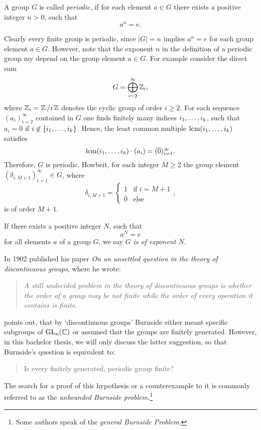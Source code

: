 \begin{defin}
A group $G$ is called \emph{periodic,} if for each element $a\in G$ there exists a positive integer $n>0$, such that
\begin{equation*}
a^n=e.
\end{equation*}
\end{defin}
Clearly every finite group is periodic, since $\lvert G\rvert=n$ implies $a^n=e$ for each group element $a\in G$. However, note that the exponent $n$ in the definition of a periodic group my depend on the group element $a\in G$. For example consider the direct sum
\begin{equation*}
G=\bigoplus_{i=2}^\infty \Z_i,
\end{equation*}
where $\Z_i=\nicefrac{\Z}{i\Z}$ denotes the cyclic group of order $i\geq 2$. For each sequence $(a_i)_{i=2}^\infty$ contained in $G$ one finds finitely many indices $\seq[k]{i}$, such that $a_i=0$ if $i\not\in\lbrace\seq[k]{i}\rbrace$. Hence, the least common multiple $\lcm(\seq[k]{i})$ satisfies
\begin{equation*}
\lcm(\seq[k]{i})\cdot(a_i)=(\overline{0})_{i=1}^\infty.
\end{equation*}
Therefore, $G$ is periodic. Howbeit, for each integer $M\geq 2$ the group element $(\delta_{i,M+1})_{i=1}^\infty\in G$, where
\begin{equation*}
\delta_{i,M+1}=\begin{cases} \overline{1} &\text{if }i=M+1\\ \overline{0}&\text{else}\end{cases},
\end{equation*}
is of order $M+1$.

If there exists a positive integer $N$, such that
\begin{equation*}
a^N=e
\end{equation*}
for all elements $a$ of a group $G$, we say $G$ \emph{is of exponent $N$.}

In 1902 \textcite{burnside1902} published his paper \emph{On an unsettled question in the theory of discontinuous groups}, where he wrote:
\begin{quotation}
\itshape%
A still undecided problem in the theory of discontinuous groups is whether the order of a group may be not finite while the order of every operation it contains is finite.
\end{quotation}
\textcite{newman2004still} points out, that by `discontinuous groups' Burnside either meant specific subgroups of $\mathrm{GL}_n(\C)$ or assumed that the groups are finitely generated. However, in this bachelor thesis, we will only discuss the latter suggestion, so that Burnside's question is equivalent to:
\begin{quotation}
Is every finitely generated, periodic group finite?
\end{quotation}
The search for a proof of this hypothesis or a counterexample to it is commonly referred to as the \emph{unbounded Burnside problem.}\footnote{Some authors speak of the \emph{general Burnside Problem}.}

